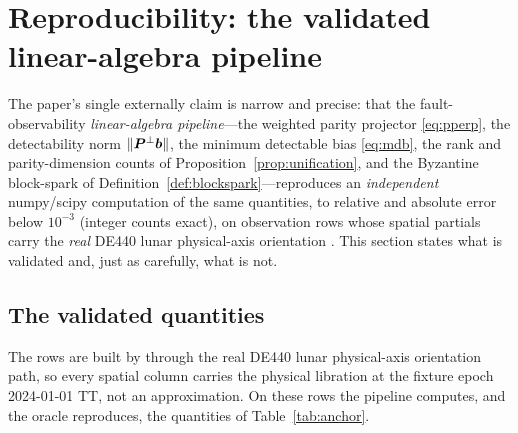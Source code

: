 \section{Reproducibility: the validated linear-algebra pipeline}
\label{sec:anchor}

The paper's single externally \Validated{} claim is narrow and precise: that the
fault-observability \emph{linear-algebra pipeline}---the weighted parity projector
\eqref{eq:pperp}, the detectability norm $\lVert\bm{P}^{\perp}\bm{b}\rVert$, the minimum detectable
bias \eqref{eq:mdb}, the rank and parity-dimension counts of
Proposition~\ref{prop:unification}, and the Byzantine block-spark of
Definition~\ref{def:blockspark}---reproduces an \emph{independent} numpy/scipy computation of
the same quantities, to relative and absolute error below $10^{-3}$ (integer counts exact),
on observation rows whose spatial partials carry the \emph{real} DE440 lunar physical-axis
orientation \citep{park2021de440}. This section states what is validated and, just as
carefully, what is not.

\subsection{The validated quantities}
\label{sec:validated}

The rows are built by  through the real DE440 lunar physical-axis
orientation path, so every spatial column carries the physical libration at the fixture
epoch 2024-01-01 TT, not an approximation. On these rows the pipeline computes, and the
oracle reproduces, the quantities of Table~\ref{tab:anchor}.

